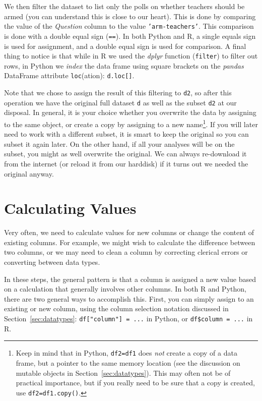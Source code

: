 We then filter the dataset to list only the polls on whether teachers should be armed
(you can understand this is close to our heart).
This is done by comparing the value of the \emph{Question} column to the value \texttt{'arm-teachers'}.
This comparison is done with a double equal sign (\verb+==+).
In both Python and R, a single equals sign is used for assignment,
and a double equal sign is used for comparison.
A final thing to notice is that while in R we used the \emph{dplyr} function (\texttt{filter}) to filter out rows,
in Python we \emph{index} the data frame using square brackets on the \emph{pandas} DataFrame attribute \texttt{loc}(ation): \verb+d.loc[]+.

Note that we chose to assign the result of this filtering to \texttt{d2},
so after this operation we have the original full dataset \texttt{d} as well as the subset \texttt{d2} at our disposal.
In general, it is your choice whether you overwrite the data by assigning to the same object,
or create a copy by assigning to a new name\footnote{Keep in mind that in Python, \texttt{\small{df2=df1}} does \emph{not} create a copy of a data frame, but a pointer to the same memory location (see the discussion on mutable objects in Section~\ref{sec:datatypes}). This may often not be of practical importance, but if you really need to be sure that a copy is created, use \texttt{\small{df2=df1.copy()}}.}.
If you will later need to work with a different subset, it is smart to keep the original so you can subset it again later.
On the other hand, if all your analyses will be on the subset, you might as well overwrite the original.
We can always re-download it from the internet (or reload it from our harddisk) if it turns out we needed the original anyway.


\section{Calculating Values}
\label{sec:calculate}

Very often, we need to calculate values for new columns or change the content of existing columns.
For example, we might wish to calculate the difference between two columns,
or we may need to clean a column by correcting clerical errors or converting between data types.

In these steps, the general pattern is that a column is assigned a new value based on
a calculation that generally involves other columns.
In both R and Python, there are two general ways to accomplish this.
First, you can simply assign to an existing or new column,
using the column selection notation discussed in Section~\ref{sec:datatypes}:
\verb+df["column"] = ...+ in Python, or \verb+df$column = ...+ in R.

